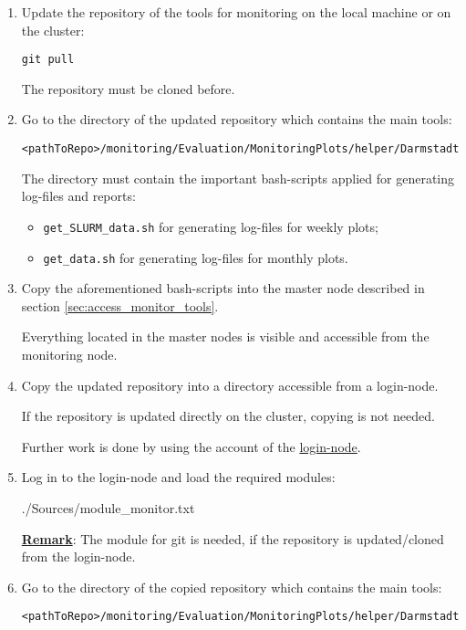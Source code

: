 \documentclass[12pt,a4paper,onecolumn]{article}
\begin{document}
\begin{enumerate}

\item Update the repository of the tools for monitoring on the local machine or on the cluster:
\begin{lstlisting}
git pull
\end{lstlisting}
The repository must be cloned before.

\item Go to the directory of the updated repository which contains the main tools:
\begin{lstlisting}
<pathToRepo>/monitoring/Evaluation/MonitoringPlots/helper/Darmstadt
\end{lstlisting}

The directory must contain the important bash-scripts applied for generating log-files and reports:
\begin{itemize}
  \item \lstinline{get_SLURM_data.sh} for generating log-files for weekly plots;
  \item \lstinline{get_data.sh} for generating log-files for monthly plots.
\end{itemize}

\item Copy the aforementioned bash-scripts into the master node described in section \ref{sec:access_monitor_tools}.

Everything located in the master nodes is visible and accessible from the monitoring node.

\item Copy the updated repository into a directory accessible from a login-node.

If the repository is updated directly on the cluster, copying is not needed.

Further work is done by using the account of the \underline{login-node}.

\item Log in to the login-node and load the required modules:

{./Sources/module_monitor.txt}
\vspace{\baselineskip}

\underline{\textbf{Remark}}: The module for git is needed, if the repository is updated/cloned from the login-node.
\vspace{\baselineskip}

\item Go to the directory of the copied repository which contains the main tools:
\begin{lstlisting}
<pathToRepo>/monitoring/Evaluation/MonitoringPlots/helper/Darmstadt
\end{lstlisting}


\end{enumerate}
\end{document}
